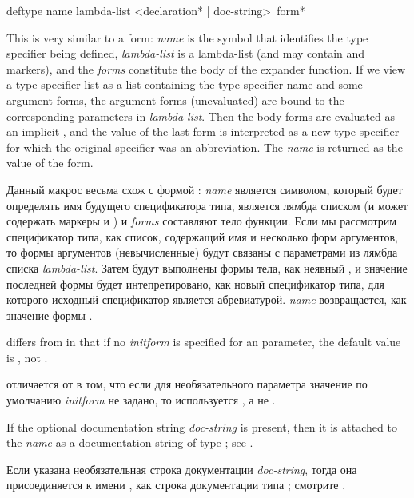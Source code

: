 \begin{defmac}
deftype name lambda-list <{declaration}* | doc-string> {\,form}*

This is very similar to a  form: \textit{name} is the
symbol that identifies the type specifier being defined, \textit{lambda-list} is
a lambda-list (and may contain  and 
markers), and
the \textit{forms} constitute the body of the expander function.  If we view a
type specifier list as a list containing the type specifier name and some argument forms,
the argument forms (unevaluated) are bound to the corresponding
parameters in \textit{lambda-list}.  Then the body forms are evaluated
as an implicit , and the value of the last form
is interpreted as a new type specifier for which the original specifier
was an abbreviation.  The \textit{name} is returned as the value of the
 form.

Данный макрос весьма схож с формой : \textit{name} является
символом, который будет определять имя будущего спецификатора типа,
 является лямбда списком (и может содержать маркеры  и
) и \textit{forms} составляют тело функции. Если мы рассмотрим
спецификатор типа, как список, содержащий имя и несколько форм аргументов, то
формы аргументов (невычисленные) будут связаны с параметрами из лямбда списка
\textit{lambda-list}. Затем будут выполнены формы тела, как неявный ,
и значение последней формы будет интепретировано, как новый спецификатор типа,
для которого исходный спецификатор является абревиатурой. \textit{name}
возвращается, как значение формы .

 differs from  in that if no \textit{initform}
is specified for an  parameter, the default value
is \cdf{*}, not {\nil}.

 отличается от  в том, что если для необязательного 
параметра значение по умолчанию \textit{initform} не задано, то используется
\cdf{*}, а не {\nil}.

If the optional documentation string \textit{doc-string} is present,
then it is attached to the \textit{name}
as a documentation string of type ; see .

Если указана необязательная строка документации \textit{doc-string}, тогда она
присоединяется к имени , как строка документации типа ;
смотрите .


\end{defmac}
